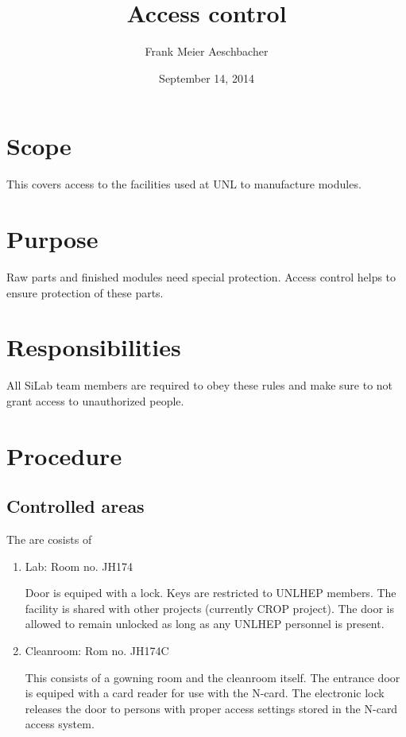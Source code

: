 \documentclass[12pt]{unlsilabsop}
\title{Access control}
\date{September 14, 2014}
\author{Frank Meier Aeschbacher}
\begin{document}
\maketitle

\section{Scope}
This covers access to the facilities used at UNL to manufacture modules.

\section{Purpose}
Raw parts and finished modules need special protection. Access control helps to ensure protection of these parts.


\section{Responsibilities}
All SiLab team members are required to obey these rules and make sure to not grant access to unauthorized people.

\section{Procedure}

\subsection{Controlled areas}
The are cosists of
\begin{enumerate}
    \item Lab: Room no. JH174

    Door is equiped with a lock. Keys are restricted to UNLHEP members. The facility is shared with other projects (currently CROP project). The door is allowed to remain unlocked as long as any UNLHEP personnel is present.
    \item Cleanroom: Rom no. JH174C

    This consists of a gowning room and the cleanroom itself. The entrance door is equiped with a card reader for use with the N-card. The electronic lock releases the door to persons with proper access settings stored in the N-card access system.
\end{enumerate}
\end{document}
